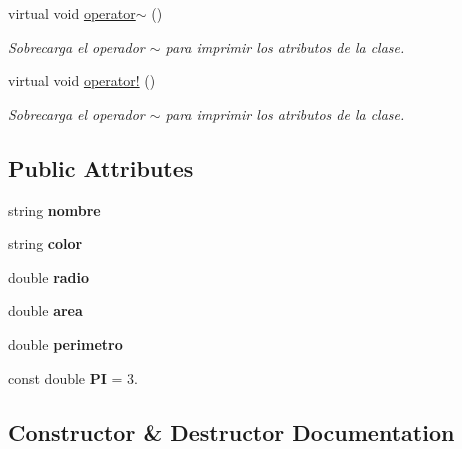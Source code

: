 \begin{DoxyCompactItemize}
\hypertarget{class_circulo_a8db226b0c3bad5b8a01d60afb45838c7}{}\label{class_circulo_a8db226b0c3bad5b8a01d60afb45838c7} 
virtual void \hyperlink{class_circulo_a8db226b0c3bad5b8a01d60afb45838c7}{operator$\sim$} ()
\begin{DoxyCompactList}\small\item\em Sobrecarga el operador $\sim$ para imprimir los atributos de la clase. \end{DoxyCompactList}\item 
\hypertarget{class_circulo_a64bd2cabfdbca872d44bf1eb13f59cbb}{}\label{class_circulo_a64bd2cabfdbca872d44bf1eb13f59cbb} 
virtual void \hyperlink{class_circulo_a64bd2cabfdbca872d44bf1eb13f59cbb}{operator!} ()
\begin{DoxyCompactList}\small\item\em Sobrecarga el operador $\sim$ para imprimir los atributos de la clase. \end{DoxyCompactList}\end{DoxyCompactItemize}
\subsection*{Public Attributes}
\begin{DoxyCompactItemize}
\item 
\hypertarget{class_circulo_a4ab11e667cbed98312c5f1688bf486c0}{}\label{class_circulo_a4ab11e667cbed98312c5f1688bf486c0} 
string {\bfseries nombre}
\item 
\hypertarget{class_circulo_a617c127941b509f6265ab59c141d7fea}{}\label{class_circulo_a617c127941b509f6265ab59c141d7fea} 
string {\bfseries color}
\item 
\hypertarget{class_circulo_aba57029c5768d344c4ef536e5323122b}{}\label{class_circulo_aba57029c5768d344c4ef536e5323122b} 
double {\bfseries radio}
\item 
\hypertarget{class_circulo_aad66b63b8596c7a11984529187ce735b}{}\label{class_circulo_aad66b63b8596c7a11984529187ce735b} 
double {\bfseries area}
\item 
\hypertarget{class_circulo_abb3ea097fcf69731319dbae8ddb21235}{}\label{class_circulo_abb3ea097fcf69731319dbae8ddb21235} 
double {\bfseries perimetro}
\item 
\hypertarget{class_circulo_a15eb99a8a0c6af955085b14baf8a35c1}{}\label{class_circulo_a15eb99a8a0c6af955085b14baf8a35c1} 
const double {\bfseries PI} = 3.
\end{DoxyCompactItemize}


\subsection{Constructor \& Destructor Documentation}
\hypertarget{class_circulo_a14db1f1a04f7adfa9f3e785fce82419c}{}\label{class_circulo_a14db1f1a04f7adfa9f3e785fce82419c} 
